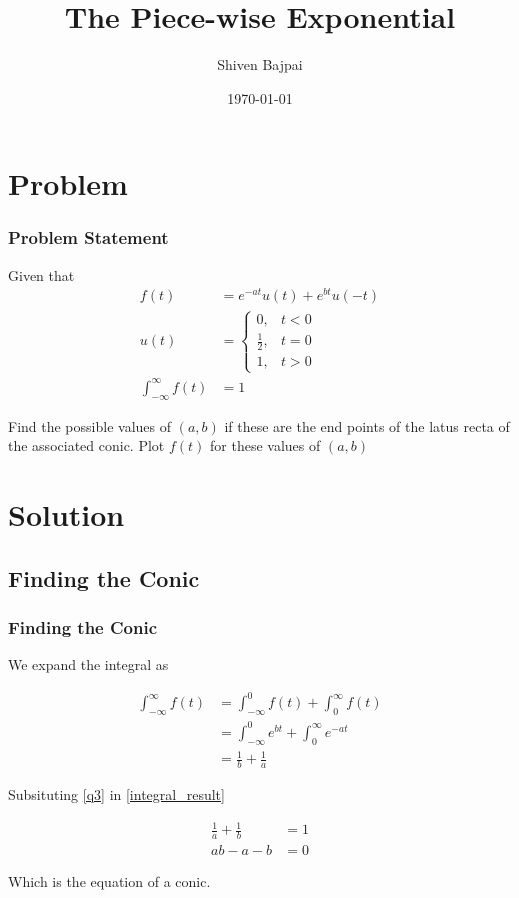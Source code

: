 \documentclass{beamer}
\title[The Piece-wise Exponential]{The Piece-wise Exponential}
\author[Shiven Bajpai]{Shiven Bajpai}
\institute[AI24BTECH11030]{AI24BTECH11030\\IIT Hyderabad}
\date{\today}
\theoremstyle{remark}
\numberwithin{equation}{section}
\begin{document}
\begin{frame}
\titlepage
\end{frame}

\begin{frame}
\tableofcontents
\end{frame}

\section{Problem}
\begin{frame}
\frametitle{Problem Statement}
Given that
\begin{align}
	f(t) &= e^{-at}u(t) + e^{bt}u(-t) \label{q1}\\
	u(t) &= \begin{cases}
		0, & t<0\\
		\frac{1}{2}, & t=0 \\
		1, & t>0
	\end{cases} \label{q2}\\
	\int_{-\infty}^{\infty} f(t) &= 1 \label{q3}
\end{align}

Find the possible values of $(a,b)$ if these are the end points of the latus recta of the associated conic. Plot $f(t)$ for these values of $(a,b)$
\end{frame}

\section{Solution}
\subsection{Finding the Conic}
\begin{frame}
\frametitle{Finding the Conic}

We expand the integral as 

\begin{align}
	\int_{-\infty}^{\infty} f(t) &= \int_{-\infty}^{0} f(t) + \int_{0}^{\infty} f(t)\\
	&= \int_{-\infty}^{0} e^{bt} + \int_{0}^{\infty} e^{-at}\\
	&= \frac{1}{b} + \frac{1}{a} \label{integral_result}
\end{align}

Subsituting \eqref{q3} in \eqref{integral_result}

\begin{align}
	\frac{1}{a} + \frac{1}{b} &= 1\\
	ab - a - b &= 0 \label{conic_ab}
\end{align}

Which is the equation of a conic.

\end{frame}
\end{document}
